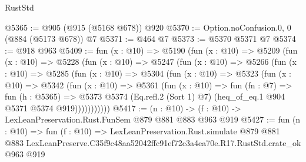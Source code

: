 \begin{lexlean}{RustStd}
\begin{coremodule}
@5365 := @905 (@915 (@5168 @678)) @920
@5370 := Option.noConfusion.{0, 0} (@884 (@5173 @678)) @7
@5371 := @464 @7
@5373 := @5370 @5371 @7
@5374 := @918 @963
@5409 := fun (x : @10) =>
  @5190
    (fun (x : @10) =>
    @5209
      (fun (x : @10) =>
      @5228
        (fun (x : @10) =>
        @5247
          (fun (x : @10) =>
          @5266
            (fun (x : @10) =>
            @5285
              (fun (x : @10) =>
              @5304
                (fun (x : @10) =>
                @5323
                  (fun (x : @10) =>
                  @5342
                    (fun (x : @10) =>
                    @5361
                      (fun (x : @10) =>
                      fun (fn : @7) =>
                      fun (h : @5365) =>
                      @5373
                        @5374
                        (Eq.refl.{2} (Sort 1) @7)
                        (heq_of_eq.{1} @904 @5371 @5374 @919)))))))))))
@5417 := (n : @10) -> (f : @10) -> LexLeanPreservation.Rust.FunSem @879 @881 @883 @963 @919
@5427 := fun (n : @10) =>
  fun (f : @10) =>
  LexLeanPreservation.Rust.simulate
    @879
    @881
    @883
    LexLeanPreserve.C35f9c48aa52042ffc91ef72c3a4ea70e.R17.RustStd.crate_ok
    @963
    @919
\end{coremodule}
\end{lexlean}
